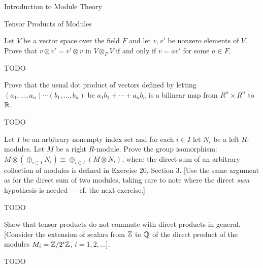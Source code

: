 \begin{chapter}{Introduction to Module Theory}
\begin{section}{Tensor Products of Modules}
\begin{problem}\label{ex:10.4.12}
Let $V$ be a vector space over the field $F$ and let $v,v'$ be nonzero elements of $V$. Prove that $v\otimes v' = v'\otimes v$ in $V\otimes_FV$ if and only if $v=av'$ for some $a\in F$.
\end{problem}
\begin{solution}TODO

\end{solution}\oneperpage



\begin{problem}\label{ex:10.4.13}
Prove that the usual dot product of vectors defined by letting $(a_1,\ldots,a_n)\cdots(b_1,\ldots,b_n)$ be $a_1b_1+\cdots+a_nb_n$ is a bilinear map from $R^n\times R^n$ to $\mathbb{R}$. 
\end{problem}
\begin{solution}TODO

\end{solution}\oneperpage



\begin{problem}\label{ex:10.4.14}
Let $I$ be an arbitrary nonempty index set and for each $i\in I$ let $N_i$ be a left $R$-modules. Let $M$ be a right $R$-module. Prove the group isomorphism: $M\otimes (\oplus_{i\in I} N_i)\cong \oplus_{i\in I}(M\otimes N_i)$, where the direct sum of an arbitrary collection of modules is defined in Exercise 20, Section 3. [Use the same argument as for the direct sum of two modules, taking care to note where the direct \emph{sum} hypothesis is needed --- cf. the next exercise.]
\end{problem}
\begin{solution}TODO

\end{solution}\oneperpage



\begin{problem}\label{ex:10.4.15}
Show that tensor products do not commute with direct products in general. [Consider the extension of scalars from $\mathbb{Z}$ to $\mathbb{Q}$ of the direct product of the modules $M_i = \mathbb{Z}/2^i\mathbb{Z}$, $i=1,2,\ldots$]. 
\end{problem}
\begin{solution}TODO

\end{solution}\oneperpage




\end{section}
\end{chapter}
